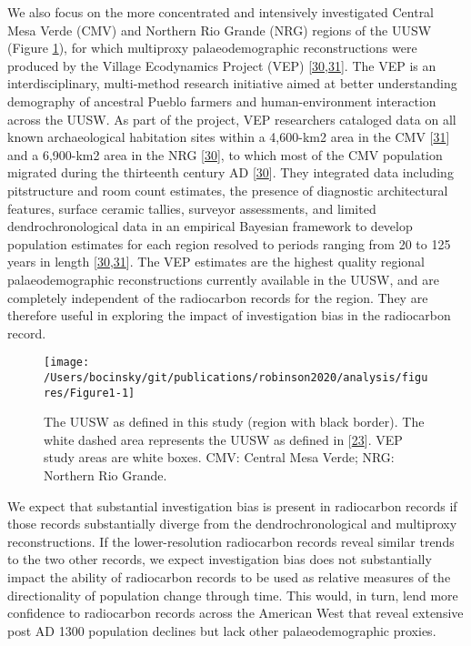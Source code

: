 \documentclass[
]{sa}
\begin{document}
We also focus on the more concentrated and intensively investigated Central Mesa Verde (CMV) and Northern Rio Grande (NRG) regions of the UUSW (Figure \ref{fig:Figure1}), for which multiproxy palaeodemographic reconstructions were produced by the Village Ecodynamics Project (VEP) {[}\protect\hyperlink{ref-Ortman2016}{30},\protect\hyperlink{ref-Schwindt2016}{31}{]}. The VEP is an interdisciplinary, multi-method research initiative aimed at better understanding demography of ancestral Pueblo farmers and human-environment interaction across the UUSW. As part of the project, VEP researchers cataloged data on all known archaeological habitation sites within a 4,600-km2 area in the CMV {[}\protect\hyperlink{ref-Schwindt2016}{31}{]} and a 6,900-km2 area in the NRG {[}\protect\hyperlink{ref-Ortman2016}{30}{]}, to which most of the CMV population migrated during the thirteenth century AD {[}\protect\hyperlink{ref-Ortman2016}{30}{]}. They integrated data including pitstructure and room count estimates, the presence of diagnostic architectural features, surface ceramic tallies, surveyor assessments, and limited dendrochronological data in an empirical Bayesian framework to develop population estimates for each region resolved to periods ranging from 20 to 125 years in length {[}\protect\hyperlink{ref-Ortman2016}{30},\protect\hyperlink{ref-Schwindt2016}{31}{]}. The VEP estimates are the highest quality regional palaeodemographic reconstructions currently available in the UUSW, and are completely independent of the radiocarbon records for the region. They are therefore useful in exploring the impact of investigation bias in the radiocarbon record.



\begin{figure}

{\centering \texttt{[image: /Users/bocinsky/git/publications/robinson2020/analysis/figures/Figure1-1]} 

}

\caption{The UUSW as defined in this study (region with black border). The white dashed area represents the UUSW as defined in {[}\protect\hyperlink{ref-Bocinsky2016}{23}{]}. VEP study areas are white boxes. CMV: Central Mesa Verde; NRG: Northern Rio Grande.}\label{fig:Figure1}
\end{figure}

We expect that substantial investigation bias is present in radiocarbon records if those records substantially diverge from the dendrochronological and multiproxy reconstructions. If the lower-resolution radiocarbon records reveal similar trends to the two other records, we expect investigation bias does not substantially impact the ability of radiocarbon records to be used as relative measures of the directionality of population change through time. This would, in turn, lend more confidence to radiocarbon records across the American West that reveal extensive post AD 1300 population declines but lack other palaeodemographic proxies.
\end{document}
